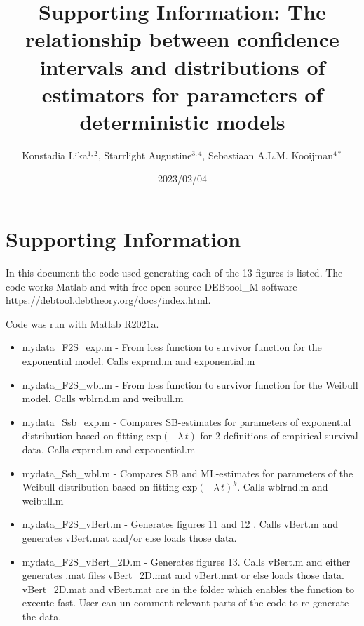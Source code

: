 \documentclass[12pt]{elsarticle}
\begin{document}
\title{Supporting Information: The relationship between confidence intervals and distributions of estimators for parameters of deterministic models}

\author{Konstadia Lika$^{1,2}$, 
        Starrlight Augustine$^{3,4}$, 
        Sebastiaan A.L.M. Kooijman$^{4\ast}$}
  
\bigskip

\address{$^1$ Department of Biology, University of Crete, 70013, Heraklion, Greece}
\address{$^2$ Institute of Computational Mathematics,
Foundation of Research and Technology Hellas, 70013 Heraklion, Greece}
\address{$^3$ MARETEC – Marine, Environment and Technology Centre, 
Instituto Superior T\'{e}cnico, Universidade de Lisboa, 1049-001 Lisboa, 
Av. Rovisco Pais, 1, 1049-001 Lisboa,
Portugal}
\address{$^4$  Amsterdam Institute for Life and Environment (A-LIFE), 
VU University Amsterdam, de Boelelaan 1087, 1081 HV, The Netherlands}
\address{$^\ast$ Corresponding author: bas.kooijman@vu.nl}

\date{2023/02/04}


\maketitle

\section{Supporting Information}

In this document the code used generating each of the 13 figures is listed. The code works Matlab\textsuperscript{\textcopyright} and with free open source DEBtool\_M software - \url{https://debtool.debtheory.org/docs/index.html}.

Code was run with Matlab\textsuperscript{\textcopyright} R2021a. 

\begin{itemize}
    \item mydata\_F2S\_exp.m - From loss function to survivor function for the exponential model. Calls exprnd.m and exponential.m
    \item mydata\_F2S\_wbl.m - From loss function to survivor function for the Weibull model. Calls wblrnd.m and weibull.m 
    \item mydata\_Ssb\_exp.m - Compares SB-estimates for parameters of exponential distribution based on fitting exp$(-\lambda \, t)$ for 2 definitions of empirical survival data. Calls exprnd.m and exponential.m
    \item mydata\_Ssb\_wbl.m - Compares SB and ML-estimates for parameters of the Weibull distribution based on fitting exp$(-\lambda \, t)^k$. Calls wblrnd.m and weibull.m 
    \item mydata\_F2S\_vBert.m - Generates figures 11 and 12 . Calls vBert.m and generates  vBert.mat and/or else loads those data.
    \item mydata\_F2S\_vBert\_2D.m  - Generates figures 13. Calls vBert.m and either generates .mat files vBert\_2D.mat and vBert.mat or else loads those data. vBert\_2D.mat and vBert.mat are in the folder which enables the function to execute fast. User can un-comment relevant parts of the code to re-generate the data. 
\end{itemize}
\end{document}
